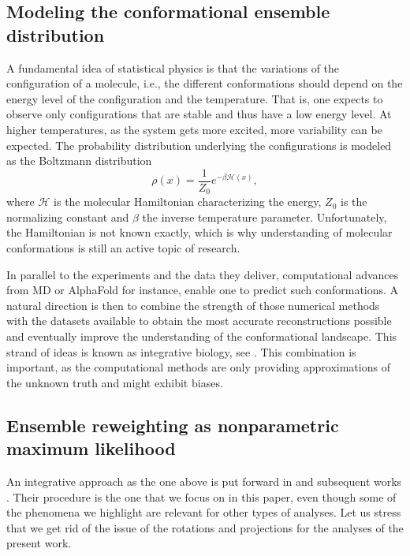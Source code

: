\documentclass[12pt]{iopart}
\theoremstyle{remark}
\begin{document}
\subsection{Modeling the conformational ensemble distribution}
\label{sec: SimConf}


 
 A fundamental idea of statistical physics is that the variations of the configuration of a molecule, i.e., the different conformations should depend on the energy level of the configuration and the temperature. That is, one expects to observe only configurations that are stable and thus have a low energy level. At higher temperatures, as the system gets more excited,  more variability can be expected.
The probability distribution underlying the configurations is modeled as the Boltzmann distribution 
\[
\rho(x) = \frac{1}{Z_0} e^{-\beta \mathcal{H}(x)},
\]
where $\mathcal{H}$ is the molecular Hamiltonian characterizing the energy, $Z_0$ is the normalizing constant and $\beta$ the inverse temperature parameter. Unfortunately, the Hamiltonian is not known exactly, which is why understanding of molecular conformations is still an active topic of research. 



In parallel to the experiments and the data they deliver, computational advances from MD \citep{jung2023machine} or AlphaFold \citep{abramson2024accurate} for instance, enable one to predict such conformations. A natural  direction is then to combine the strength of those numerical methods with the datasets available to obtain the most accurate reconstructions possible and eventually improve the understanding of the conformational landscape. This strand of ideas is known as integrative biology, see  \citet{ward2013integrative,bottaro2018biophysical}. This combination is  important, as the computational methods are only providing approximations of the unknown truth and might exhibit biases.






\subsection{Ensemble reweighting as nonparametric maximum likelihood }
\label{sec: EnsRew}

An integrative approach as the one above is put forward in \citet{tang2023ensemble} and subsequent works \citep{silva2026cryo}. Their procedure is the one that we focus on in this paper, even though some of the phenomena we highlight are relevant for other types of analyses. Let us stress that we get rid of the issue of the rotations and projections for the analyses of the present work.
\end{document}
